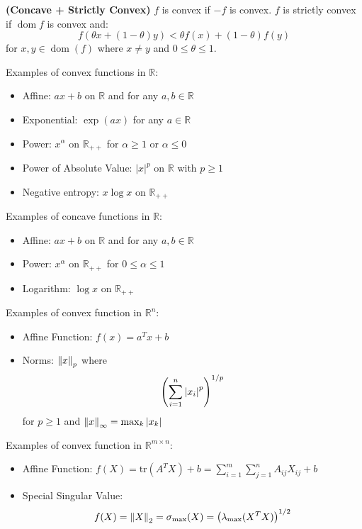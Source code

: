 \begin{definition}{\textbf{(Concave + Strictly Convex)}}
    $f$ is convex if $-f$ is convex. $f$ is strictly convex if $\operatorname{dom} f$ is convex and:
    \begin{equation*}
        f(\theta x + (1-\theta)y) < \theta f(x) + (1-\theta)f(y)
    \end{equation*}
    for $x, y\in\operatorname{dom}(f)$ where $x\ne y$ and $0\le\theta\le1$.
\end{definition}

\begin{remark}
    Examples of convex functions in $\mathbb{R}$:
    \begin{itemize}
        \item Affine: $ax+b$ on $\mathbb{R}$ and for any $a, b\in \mathbb{R}$
        \item Exponential: $\exp(ax)$ for any $a\in \mathbb{R}$
        \item Power: $x^\alpha$ on $\mathbb{R}_{++}$ for $\alpha\ge1$ or $\alpha\le0$
        \item Power of Absolute Value: $|x|^p$ on $\mathbb{R}$ with $p\ge1$
        \item Negative entropy: $x\log x$ on $\mathbb{R}_{++}$
    \end{itemize}
    Examples of concave functions in $\mathbb{R}$:
    \begin{itemize}
        \item Affine: $ax+b$ on $\mathbb{R}$ and for any $a, b\in \mathbb{R}$
        \item Power: $x^\alpha$ on $\mathbb{R}_{++}$ for $0\le\alpha\le1$
        \item Logarithm: $\log x$ on $\mathbb{R}_{++}$
    \end{itemize}
\end{remark}

\begin{remark}
    Examples of convex function in $\mathbb{R}^n$:
    \begin{itemize}
        \item Affine Function: $f(x) = a^Tx + b$
        \item Norms: $\left\lVert x\right\rVert_p$ where 
        \begin{equation*}
            \left( \sum^n_{i=1} \left| x_i \right|^p \right)^{1/p}
        \end{equation*}
        for $p\ge1$ and $\left\lVert x\right\rVert_\infty = \max_k|x_k|$
    \end{itemize}
    Examples of convex function in $\mathbb{R}^{m\times n}$:
    \begin{itemize}
        \item Affine Function: $f(X) = \text{tr}(A^TX) + b = \sum^m_{i=1}\sum^n_{j=1}A_{ij}X_{ij} + b$
        \item Special Singular Value:
        \begin{equation*}
            f(X) = \left\lVert X\right\rVert_2 = \sigma_\text{max}(X) = \left( \lambda_\text{max}(X^TX) \right)^{1/2}
        \end{equation*}
    \end{itemize}
\end{remark}

